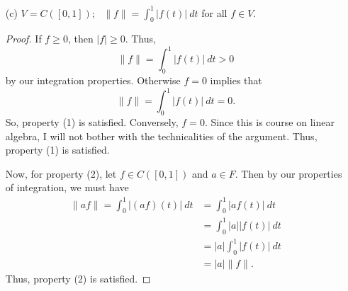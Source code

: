 \begin{enumerate}
\begin{proof}
            Let \( a \in F  \). Then observe that
            \begin{align*}
                \|af\| = \max\limits_{t \in [0,1]} | (af)(t) | &= \max\limits_{t \in [0,1]} | a f(t) |   \\
                                                               &= \max\limits_{t \in [0,1]} | a |  | f(t) | \\
                                                               &= | a |  \max\limits_{ t \in [0,1]} | f(t) | = | a |  \|f\|.
            \end{align*}
            Thus, (2) is satisfied.

            Now, let \( f,g \in C([0,1]) \). By using the properties of the absolute value, we have
            \begin{align*}
                \|f + g\|  = \max\limits_{t \in [0,1]} | (f+g)(t) |  &= \max\limits_{t \in [0,1]} | f(t) + g(t) |  \\
                                                                     &\leq \max\limits_{t \in [0,1]} | f(t) |  + \max\limits_{t \in [0,1]} | g(t) | \\ 
                                                                     &= \|f\| + \|g\|. 
            \end{align*}
            Thus, we have that \( \|f +g\| \leq  \|f\| + \|g\| \) for all \( t \in [0,1] \). Thus, (3) is satisfied. Hence, \( \|f \| = \max\limits_{t \in [0,1]} | f(t) |  \) is a norm over \( V  \).
        \end{proof}
    \item[(c)] \( V = C([0,1]); \ \ \ \|f\| = \int_{ 0 }^{ 1 } | f(t) |  \ dt \) for all \( f \in V  \).
        \begin{proof}
            If \( f \geq 0  \), then \( | f |  \geq 0  \). Thus,
        \[  \|f \| = \int_{ 0 }^{ 1 }  | f(t) |  \ dt > 0  \]
        by our integration properties. Otherwise \( f = 0  \) implies that
        \[  \|f\| = \int_{ 0 }^{ 1 } | f(t) |  \ dt = 0. \]
        So, property (1) is satisfied. Conversely, \( f = 0  \). Since this is course on linear algebra, I will not bother with the technicalities of the argument. Thus, property (1) is satisfied.  

        Now, for property (2), let \( f \in C([0,1]) \) and \( a \in F  \). Then by our properties of integration, we must have
        \begin{align*}
            \|af\| = \int_{ 0 }^{ 1 } | (af)(t) |  \ dt &= \int_{ 0 }^{ 1 } | a f(t) |  \ dt \\  
                                                        &= \int_{ 0 }^{ 1 }  | a |  | f(t) |  \ dt \\
                                                        &= | a | \int_{ 0 }^{ 1 }  | f(t) |  \ dt \\
                                                        &= | a |  \|f\|.
        \end{align*}
        Thus, property (2) is satisfied.


\end{proof}
\end{enumerate}
